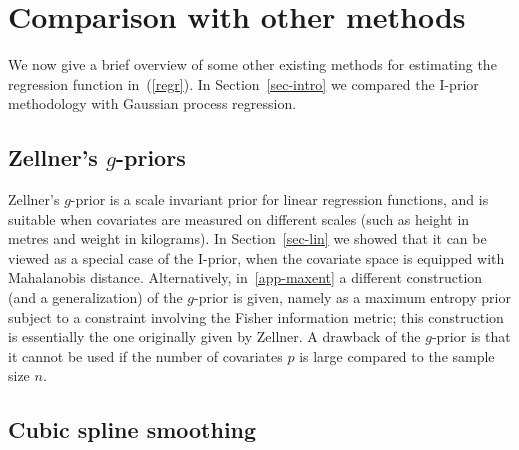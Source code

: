 \documentclass[preprint,12pt,authoryear]{elsarticle}
\begin{document}




\section{Comparison with other methods}\label{sec-other}

We now give a brief overview of some other existing methods for estimating the regression function in~(\ref{regr}).
In Section~\ref{sec-intro} we compared the I-prior methodology with Gaussian process regression. 


\subsection{Zellner's $g$-priors}\label{sec-gprior}

Zellner's $g$-prior \citep{zellner86} is a scale invariant prior for linear regression functions, and is suitable when covariates are measured on different scales (such as height in metres and weight in kilograms).
In Section~\ref{sec-lin} we showed that it can be viewed as a special case of the I-prior, when the covariate space is equipped with Mahalanobis distance. 
Alternatively, in~\ref{app-maxent} a different construction (and a generalization) of the $g$-prior is given, namely as a maximum entropy prior subject to a constraint involving the Fisher information metric; this construction is essentially the one originally given by Zellner.
A drawback of the $g$-prior is that it cannot be used if the number of covariates $p$ is large compared to the sample size $n$. 




\subsection{Cubic spline smoothing}
\end{document}
